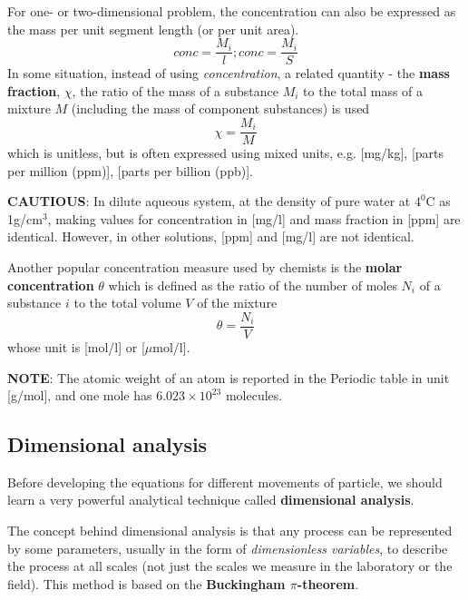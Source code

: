 For one- or two-dimensional problem, the concentration can also be
expressed as the mass per unit segment length (or per unit area).
\begin{equation}
  \label{eq:216}
   conc= \frac{M_i}{l}; conc = \frac{M_i}{S}
\end{equation}
In some situation, instead of using {\it concentration}, a related
quantity - the {\bf mass fraction}, $\chi$, the ratio of the mass of a
substance $M_i$ to the total mass of a mixture $M$ (including the mass
of component substances) is used
\begin{equation}
  \label{eq:167}
  \chi = \frac{M_i}{M}
\end{equation}
which is unitless, but is often expressed using mixed units,
e.g. [mg/kg], [parts per million (ppm)], [parts per billion (ppb)].

{\bf CAUTIOUS}: In dilute aqueous system, at the density of pure water
at $4^0$C as 1g/cm$^3$, making values for concentration in [mg/l] and
mass fraction in [ppm] are identical. However, in other solutions,
[ppm] and [mg/l] are not identical.

Another popular concentration measure used by chemists is the {\bf
  molar concentration} $\theta$ which is defined as the ratio of the
number of moles $N_i$ of a substance $i$ to the total volume $V$ of the
mixture
\begin{equation}
  \label{eq:167}
  \theta = \frac{N_i}{V}
\end{equation}
whose unit is [mol/l] or [$\mu$mol/l]. 

{\bf NOTE}: The atomic weight of an atom is reported in the Periodic
table in unit [g/mol], and one mole has  $6.023\times 10^{23}$
molecules. 



\subsection{Dimensional analysis}
\label{sec:dimensional-analysis}

Before developing the equations for different movements of particle,
we should learn a very powerful analytical technique called {\bf
  dimensional analysis}.

The concept behind dimensional analysis is that any process can be
represented by some parameters, usually in the form of {\it
  dimensionless variables}, to describe the process at all scales (not
just the scales we measure in the laboratory or the field). This
method is based on the {\bf Buckingham $\pi$-theorem}.

